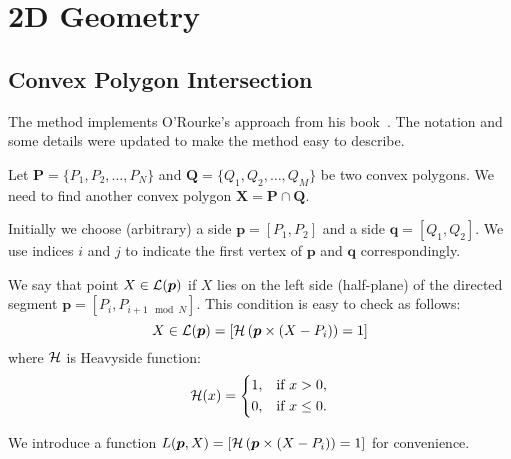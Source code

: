
\chapter{2D Geometry}\label{ch:geometry2d}

\section{Convex Polygon Intersection}

The method implements O'Rourke's approach from his
book~\cite{bib:orourke}. The notation and some details were updated to
make the method easy to describe.

Let $\bm{P}=\{P_1,P_2,\dots,P_N\}$ and $\bm{Q}=\{Q_1,Q_2,\dots,Q_M\}$
be two convex polygons. We need to find another convex polygon
$\bm{X}=\bm{P}\cap\bm{Q}$.

Initially we choose (arbitrary) a side $\bm{p}=[P_1,P_2]$ and a side
$\bm{q}=[Q_1,Q_2]$. We use indices $i$ and $j$ to indicate the
first vertex of $\bm{p}$ and $\bm{q}$ correspondingly. 

We say that point $X\in {\cal L}(\bm{p})$ if $X$ lies on the left side
(half-plane) of the directed segment $\bm{p}=[P_i,P_{i+1\mod N}]$. This
condition is easy to check as follows:
\begin{equation}
  X \in {\cal L}(\bm{p}) =
  \left[ {\cal H}\left( { \bm{p} \times (X-P_i) } \right) = 1 \right]
\end{equation}
where ${\cal H}$ is Heavyside function:
\begin{equation}
  {\cal H}(x) = \left\{
  \begin{aligned}
    1, &\quad \text{if}\,\,x > 0,\\
    0, &\quad  \text{if}\,\,x \le 0.\\
  \end{aligned}\right.
\end{equation}

We introduce a function $L(\bm{p},X) = \left[{\cal H}\left( { \bm{p} \times
  (X-P_i) } \right) = 1\right]$ for convenience.

